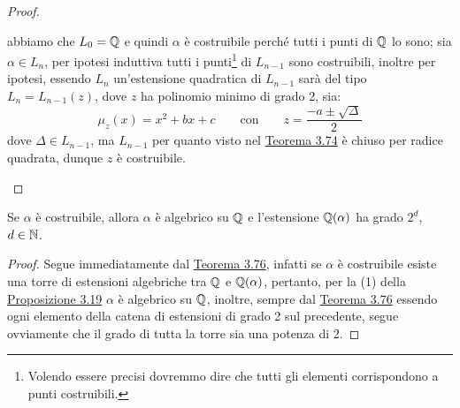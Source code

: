 \documentclass[11pt]{scrartcl}
\begin{document}
\begin{proof}
\begin{itemize}
        abbiamo che $L_0 = \mathbb Q$ e quindi $\alpha$ è costruibile perché tutti i punti di $\mathbb Q$ lo sono; sia $\alpha \in L_n$, per ipotesi induttiva tutti i punti\footnote{Volendo essere precisi dovremmo dire che tutti
        gli elementi corrispondono a punti costruibili.} di $L_{n-1}$ sono costruibili, inoltre per ipotesi, essendo $L_n$ un'estensione quadratica di $L_{n-1}$ sarà del tipo $L_n = L_{n-1}(z)$, dove $z$ ha polinomio minimo di grado 2, sia:
        \[ \mu_z(x) = x^2+bx+c \qquad \text{con} \qquad z = \frac{-a \pm \sqrt{\Delta}}{2}
            \]
        dove $\Delta \in L_{n-1}$, ma $L_{n-1}$ per quanto visto nel \hyperref[3.74]{Teorema 3.74} è chiuso per radice quadrata, dunque $z$ è costruibile.
    \end{itemize}
\end{proof}

\begin{corollary}
    \label{3.77}
    Se $\alpha$ è costruibile, allora $\alpha$ è algebrico su $\mathbb Q$ e l'estensione $\mathbb Q(\alpha)$ ha grado $2^d$, $d \in \mathbb N$.
\end{corollary}

\begin{proof}
    Segue immediatamente dal \hyperref[3.76]{Teorema 3.76}, infatti se $\alpha$ è costruibile esiste una torre di estensioni algebriche tra $\mathbb Q$ e $\mathbb Q(\alpha)$,
    pertanto, per la (1) della \hyperref[3.19]{Proposizione 3.19} $\alpha$ è algebrico su $\mathbb Q$, inoltre, sempre dal \hyperref[3.76]{Teorema 3.76} 
    essendo ogni elemento della catena di estensioni di grado 2 sul precedente, segue ovviamente che il grado di tutta la torre sia una potenza di 2.
\end{proof}
\end{document}
